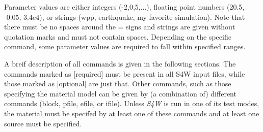 \documentclass[11pt]{report}
\begin{document}
Parameter values are either integers (-2,0,5,...), floating point numbers (20.5, -0.05, 3.4e4), or strings
(wpp, earthquake, my-favorite-simulation). Note that there must be no spaces around the = signs and
strings are given without quotation marks and must not contain spaces. Depending on the specific
command, some parameter values are required to fall within specified ranges.

A breif description of all commands is given in the following sections. The commands marked as
[required] must be present in all S4W input files, while those marked as [optional] are just
that. Other commands, such as those specifying the material model can be given by (a combination of)
different commands (block, pfile, efile, or ifile). Unless \emph{S4W} is run in one of its test
modes, the material must be specifed by at least one of these commands and at least one source must
be specified.
\end{document}
